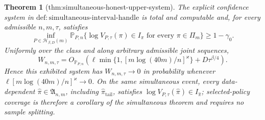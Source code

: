 \documentclass{article}
\newtheorem{theorem}{Theorem}
\begin{document}
\begin{theorem}[thm:simultaneous-honest-upper-system]\label{thm:simultaneous-honest-upper-system}
The explicit confidence system in \(\mathrm{def{:}simultaneous\text{-}interval\text{-}handle}\) is total and computable and, for every admissible \(n,m,\tau\), satisfies \[\inf_{P\in\mathcal H_{\beta,D}(m)}\mathbb P_{P,n}\{\log V_{P,\tau}(\pi)\in I_{\pi}\text{ for every }\pi\in\Pi_m\}\ge1-\gamma_0.\] Uniformly over the class and along arbitrary admissible joint sequences, \[W_{n,m,\tau}=O_{\mathbb P_{P,n}}\!\left(\ell\min\{1,[m\log(40m)/n]^{\varkappa}\}+D\tau^{\beta/4}\right).\] Hence this exhibited system has \(W_{n,m,\tau}\to0\) in probability whenever \(\ell[m\log(40m)/n]^{\varkappa}\to0\). On the same simultaneous event, every data-dependent \(\widehat\pi\in\mathfrak A_{n,m}\), including \(\widehat\pi_{\mathrm{tail}}\), satisfies \(\log V_{P,\tau}(\widehat\pi)\in I_{\widehat\pi}\); selected-policy coverage is therefore a corollary of the simultaneous theorem and requires no sample splitting.
\end{theorem}
\end{document}
